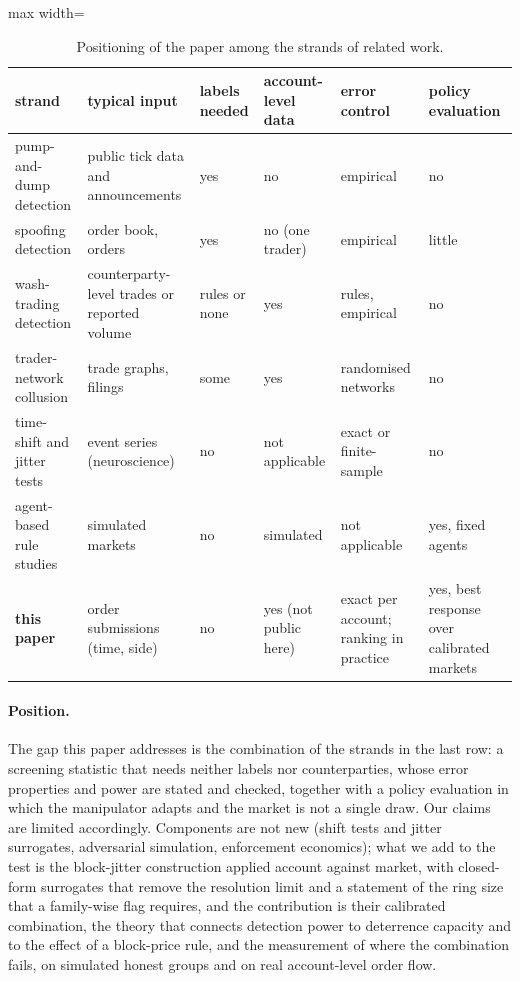 \begin{table}[t]
\centering\footnotesize
\begin{adjustbox}{max width=\linewidth}
\begin{tabular}{p{3.6cm}p{3.4cm}p{1.4cm}p{1.6cm}p{2.3cm}p{1.8cm}}
\toprule
strand & typical input & labels needed & account-level data & error control & policy evaluation\\
\midrule
pump-and-dump detection & public tick data and announcements & yes & no & empirical & no\\
spoofing detection & order book, orders & yes & no (one trader) & empirical & little\\
wash-trading detection & counterparty-level trades or reported volume & rules or none & yes & rules, empirical & no\\
trader-network collusion & trade graphs, filings & some & yes & randomised networks & no\\
time-shift and jitter tests & event series (neuroscience) & no & not applicable & exact or finite-sample & no\\
agent-based rule studies & simulated markets & no & simulated & not applicable & yes, fixed agents\\
\textbf{this paper} & order submissions (time, side) & no & yes (not public here) & exact per account; ranking in practice & yes, best response over calibrated markets\\
\bottomrule
\end{tabular}
\end{adjustbox}
\caption{Positioning of the paper among the strands of related work.}\label{tab:positioning}
\end{table}

\paragraph{Position.} The gap this paper addresses is the combination of the strands in the last row: a screening statistic that needs neither labels nor counterparties, whose error properties and power are stated and checked, together with a policy evaluation in which the manipulator adapts and the market is not a single draw. Our claims are limited accordingly. Components are not new (shift tests and jitter surrogates, adversarial simulation, enforcement economics); what we add to the test is the block-jitter construction applied account against market, with closed-form surrogates that remove the resolution limit and a statement of the ring size that a family-wise flag requires, and the contribution is their calibrated combination, the theory that connects detection power to deterrence capacity and to the effect of a block-price rule, and the measurement of where the combination fails, on simulated honest groups and on real account-level order flow.
